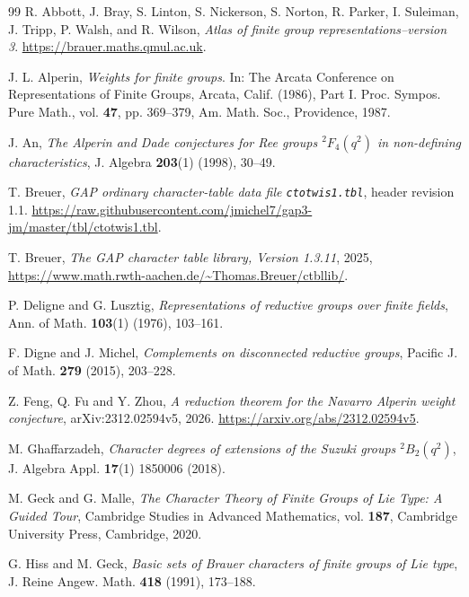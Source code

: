\documentclass[11pt,a4paper]{article}
\numberwithin{equation}{section}
\theoremstyle{definition}
\theoremstyle{remark}
\begin{document}
{}
\begin{thebibliography}{99}
R. Abbott, J. Bray, S. Linton, S. Nickerson, S. Norton, R. Parker, I. Suleiman, J. Tripp, P. Walsh, and R. Wilson, \emph{Atlas of finite group representations--version 3}. \url{https://brauer.maths.qmul.ac.uk}.

J. L. Alperin, \emph{Weights for finite groups}. In: The Arcata Conference on Representations of Finite Groups, Arcata, Calif. (1986), Part I. Proc. Sympos. Pure Math., vol. {\bf 47}, pp. 369--379, Am. Math. Soc., Providence, 1987.

J. An, \emph{The Alperin and Dade conjectures for Ree groups ${}^2F_4(q^2)$ in non-defining characteristics}, J. Algebra \textbf{203}(1) (1998), 30--49.


T. Breuer, \emph{GAP ordinary character-table data file \texttt{ctotwis1.tbl}}, header revision 1.1. \url{https://raw.githubusercontent.com/jmichel7/gap3-jm/master/tbl/ctotwis1.tbl}. 

T. Breuer, \emph{The GAP character table library, Version 1.3.11}, 2025, \url{https://www.math.rwth-aachen.de/~Thomas.Breuer/ctbllib/}.


P. Deligne and G. Lusztig, \emph{Representations of reductive groups over finite fields}, Ann. of Math. {\bf 103}(1) (1976), 103--161. 

F. Digne and J. Michel, \emph{Complements on disconnected reductive groups},  Pacific J. of Math. \textbf{279} (2015), 203--228. 

Z. Feng, Q. Fu and Y. Zhou, \emph{A reduction theorem for the Navarro Alperin weight conjecture}, arXiv:2312.02594v5, 2026. 
\url{https://arxiv.org/abs/2312.02594v5}.

M. Ghaffarzadeh, \emph{Character degrees of extensions of the Suzuki groups \({}^2B_2(q^2)\)}, J. Algebra Appl. {\bf 17}(1) 1850006 (2018). 

M. Geck and G. Malle, \emph{The Character Theory of Finite Groups of Lie Type: A Guided Tour}, Cambridge Studies in Advanced Mathematics, vol. {\bf 187}, Cambridge University Press, Cambridge, 2020.


G. Hiss and M. Geck, \emph{Basic sets of Brauer characters of finite groups of Lie type}, J. Reine Angew. Math.
{\bf 418} (1991), 173--188. %



\end{thebibliography}
\end{document}
